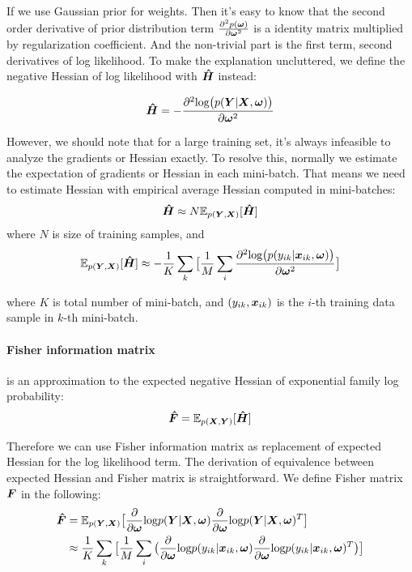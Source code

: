 If we use Gaussian prior for weights. Then it's easy to know that the second order derivative of prior distribution term $\frac{\partial^2p(\boldsymbol \omega)}{\partial\boldsymbol \omega^2}$ is a identity matrix multiplied by regularization coefficient. And the non-trivial part is the first term, second derivatives of log likelihood. To make the explanation uncluttered, we define the negative Hessian of log likelihood with $\boldsymbol{\hat{H}}$ instead:

\[
\boldsymbol{\hat{H}} = -\frac{\partial^2\text{log}\big(p(\boldsymbol Y|\boldsymbol X, \boldsymbol \omega)\big)}{\partial \boldsymbol \omega^2}
\] 

However, we should note that for a large training set, it's always infeasible to analyze the gradients or Hessian exactly. To resolve this, normally we estimate the expectation of gradients or Hessian in each mini-batch. That means we need to estimate Hessian with empirical average Hessian computed in mini-batches:
\[
\boldsymbol{\hat H} \approx N\mathbb E_{p(\boldsymbol Y, \boldsymbol X)}[\boldsymbol{\hat{H}}]
\]
where $N$ is size of training samples, and 
\begin{equation} \label{expected hessian}
\mathbb E_{p(\boldsymbol Y, \boldsymbol X)}[\boldsymbol{\hat{H}}] \approx -\frac{1}{K}\sum_{k}\big[\frac{1}{M}\sum_{i}\frac{\partial^2\text{log}\big(p(y_{ik}|\boldsymbol x_{ik}, \boldsymbol \omega)\big)}{\partial \boldsymbol \omega^2}\big]
\end{equation}

where $K$ is total number of mini-batch, and $(y_{ik}, \boldsymbol x_{ik})$ is the $i$-th training data sample in $k$-th mini-batch. 

\paragraph{Fisher information matrix} is an approximation to the expected negative Hessian of exponential family log probability:
\[
\boldsymbol{\hat{F}} = \mathbb E_{p(\boldsymbol X, \boldsymbol Y)}[\boldsymbol{\hat{H}}]
\]

Therefore we can use Fisher information matrix as replacement of expected Hessian for the log likelihood term. The derivation of equivalence between expected Hessian and Fisher matrix is straightforward. We define Fisher matrix $\boldsymbol F$ in the following:
\begin{equation}
\begin{aligned}\label{Fisher}
\boldsymbol{\hat{F}} &= \mathbb E_{p(\boldsymbol Y, \boldsymbol X)}\big[\frac{\partial}{\partial \boldsymbol \omega}\text{log}p(\boldsymbol Y|\boldsymbol X,\boldsymbol \omega)\frac{\partial}{\partial \boldsymbol \omega}\text{log}p(\boldsymbol Y|\boldsymbol X,\boldsymbol \omega)^T\big] \\
&\approx \frac{1}{K}\sum_{k}\big[\frac{1}{M}\sum_{i}
\big(\frac{\partial}{\partial \boldsymbol \omega}\text{log}p(y_{ik}|\boldsymbol x_{ik},\boldsymbol \omega)\frac{\partial}{\partial \boldsymbol \omega}\text{log}p(y_{ik}|\boldsymbol x_{ik},\boldsymbol \omega)^T\big)\big]
\end{aligned}
\end{equation}

